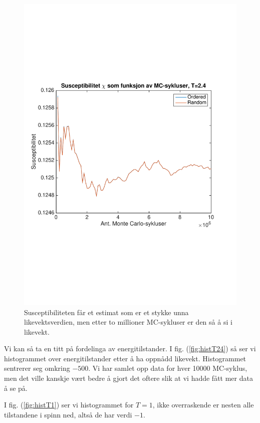 \documentclass[norsk, 10pt]{article}
\begin{document}
\begin{figure}[H]
\centering
\includegraphics[scale = 0.6, trim = 1cm 8cm 1cm 8cm]{b_chi_MC_L2_T24.pdf}
\caption{Susceptibiliteten får et estimat som er et stykke unna likevektsverdien, men etter to millioner MC-sykluser er den så å si i likevekt.}
\label{fig:chiT24}
\end{figure}

Vi kan så ta en titt på fordelinga av energitilstander. I fig. (\ref{fig:histT24}) så ser vi histogrammet over energitilstander etter å ha oppnådd likevekt. Histogrammet sentrerer seg omkring $-500$. Vi har samlet opp data for hver 10000 MC-syklus, men det ville kanskje vært bedre å gjort det oftere slik at vi hadde fått mer data å se på.

I fig. (\ref{fig:histT1}) ser vi histogrammet for $T=1$, ikke overraskende er nesten alle tilstandene i spinn ned, altså de har verdi $-1$.
\end{document}
